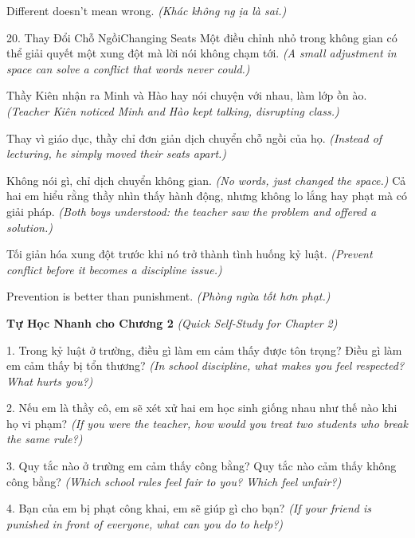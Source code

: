 \begin{ghinhoanh}
Different doesn't mean wrong.
\textit{(Khác không ng
ịa là sai.)}
\end{ghinhoanh}

\begin{truyen}{20. Thay Đổi Chỗ Ngồi}{Changing Seats}
Một điều chỉnh nhỏ trong không gian có thể giải quyết một xung đột mà lời nói không chạm tới.
\textit{(A small adjustment in space can solve a conflict that words never could.)}

Thầy Kiên nhận ra Minh và Hào hay nói chuyện với nhau, làm lớp ồn ào.
\textit{(Teacher Kiên noticed Minh and Hào kept talking, disrupting class.)}

Thay vì giáo dục, thầy chỉ đơn giản dịch chuyển chỗ ngồi của họ.
\textit{(Instead of lecturing, he simply moved their seats apart.)}

Không nói gì, chỉ dịch chuyển không gian.
\textit{(No words, just changed the space.)}
Cả hai em hiểu rằng thầy nhìn thấy hành động, nhưng không lo lắng hay phạt mà có giải pháp.
\textit{(Both boys understood: the teacher saw the problem and offered a solution.)}

Tối giản hóa xung đột trước khi nó trở thành tình huống kỷ luật.
\textit{(Prevent conflict before it becomes a discipline issue.)}
\end{truyen}

\begin{baihoc}
Prevention is better than punishment.
\textit{(Phòng ngừa tốt hơn phạt.)}
\end{baihoc}

\begin{tuhocnhanh}
\textbf{Tự Học Nhanh cho Chương 2}
\textit{(Quick Self-Study for Chapter 2)}

1. Trong kỷ luật ở trường, điều gì làm em cảm thấy được tôn trọng? Điều gì làm em cảm thấy bị tổn thương?
\textit{(In school discipline, what makes you feel respected? What hurts you?)}

2. Nếu em là thầy cô, em sẽ xét xử hai em học sinh giống nhau như thế nào khi họ vi phạm?
\textit{(If you were the teacher, how would you treat two students who break the same rule?)}

3. Quy tắc nào ở trường em cảm thấy công bằng? Quy tắc nào cảm thấy không công bằng?
\textit{(Which school rules feel fair to you? Which feel unfair?)}

4. Bạn của em bị phạt công khai, em sẽ giúp gì cho bạn?
\textit{(If your friend is punished in front of everyone, what can you do to help?)}
\end{tuhocnhanh}

\ngancach

